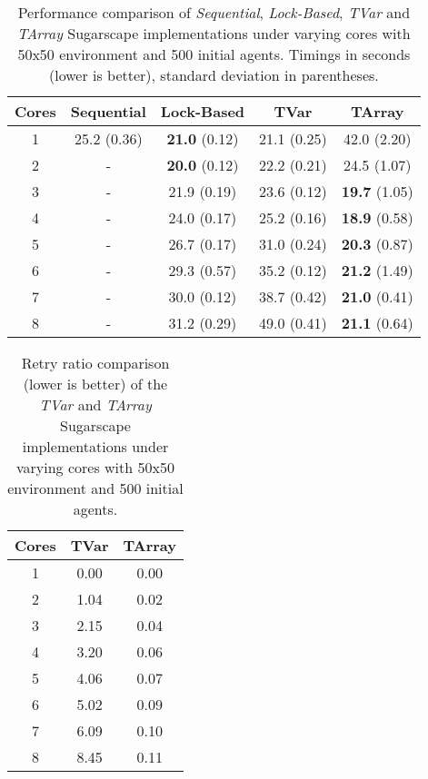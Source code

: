 \begin{table}
	\centering
  	\begin{tabular}{ c || c | c | c | c }
        Cores  & Sequential  & Lock-Based            & TVar         & TArray                \\ \hline \hline 
    		1      & 25.2 (0.36) & \textbf{21.0} (0.12)  & 21.1 (0.25)  & 42.0 (2.20)           \\ \hline
   		2      & -           & \textbf{20.0} (0.12)  & 22.2 (0.21)  & 24.5 (1.07)           \\ \hline
   		3      & -           & 21.9 (0.19)           & 23.6 (0.12)  & \textbf{19.7} (1.05)  \\ \hline
   		4      & -           & 24.0 (0.17)           & 25.2 (0.16)  & \textbf{18.9} (0.58)  \\ \hline
   		5      & -           & 26.7 (0.17)           & 31.0 (0.24)  & \textbf{20.3} (0.87)  \\ \hline
   		6      & -           & 29.3 (0.57)           & 35.2 (0.12)  & \textbf{21.2} (1.49)  \\ \hline
   		7      & -           & 30.0 (0.12)           & 38.7 (0.42)  & \textbf{21.0} (0.41)  \\ \hline
   		8      & -           & 31.2 (0.29)           & 49.0 (0.41)  & \textbf{21.1} (0.64)  \\ \hline \hline
   	\end{tabular}
 
  	\caption{Performance comparison of \textit{Sequential}, \textit{Lock-Based}, \textit{TVar} and \textit{TArray} Sugarscape implementations under varying cores with 50x50 environment and 500 initial agents. Timings in seconds (lower is better), standard deviation in parentheses.}
	\label{tab:sugarscape_varyingcores_constagents}
\end{table}

\begin{table}
	\centering
  	\begin{tabular}{ c || c | c }
        Cores & TVar  & TArray  \\ \hline \hline 
    		1     & 0.00  & 0.00    \\ \hline
   		2     & 1.04  & 0.02    \\ \hline
   		3     & 2.15  & 0.04    \\ \hline
   		4     & 3.20  & 0.06    \\ \hline
   		5     & 4.06  & 0.07    \\ \hline
   		6     & 5.02  & 0.09    \\ \hline
   		7     & 6.09  & 0.10    \\ \hline
   		8     & 8.45  & 0.11    \\ \hline \hline
   	\end{tabular}
 
  	\caption{Retry ratio comparison (lower is better) of the \textit{TVar} and \textit{TArray} Sugarscape implementations under varying cores with 50x50 environment and 500 initial agents.}
	\label{tab:sugarscape_retry_ratios}
\end{table}


